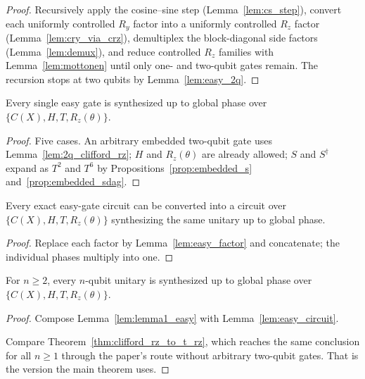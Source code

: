 \begin{proof}
  \leanok
  Recursively apply the cosine--sine step (Lemma~\ref{lem:cs_step}), convert
  each uniformly controlled $R_y$ factor into a uniformly controlled $R_z$
  factor (Lemma~\ref{lem:cry_via_crz}), demultiplex the block-diagonal side
  factors (Lemma~\ref{lem:demux}), and reduce controlled $R_z$ families with
  Lemma~\ref{lem:mottonen} until only one- and two-qubit gates remain.  The
  recursion stops at two qubits by Lemma~\ref{lem:easy_2q}.
\end{proof}

\begin{lemma}
  \label{lem:easy_factor}
  \leanok
  Every single easy gate is synthesized up to global phase over
  $\{C(X), H, T, R_z(\theta)\}$.
\end{lemma}

\begin{proof}
  \leanok
  Five cases.  An arbitrary embedded two-qubit gate uses
  Lemma~\ref{lem:2q_clifford_rz}; $H$ and $R_z(\theta)$ are already allowed;
  $S$ and $S^\dagger$ expand as $T^2$ and $T^6$ by
  Propositions~\ref{prop:embedded_s} and~\ref{prop:embedded_sdag}.
\end{proof}

\begin{lemma}
  \label{lem:easy_circuit}
  \leanok
  Every exact easy-gate circuit can be converted into a circuit over
  $\{C(X),H,T,R_z(\theta)\}$ synthesizing the same unitary up to global phase.
\end{lemma}

\begin{proof}
  \leanok
  Replace each factor by Lemma~\ref{lem:easy_factor} and concatenate; the
  individual phases multiply into one.
\end{proof}

\begin{theorem}
  \label{thm:clifford_rz_from_lemma1}
  \leanok
  For $n \ge 2$, every $n$-qubit unitary is synthesized up to global phase over
  $\{C(X),H,T,R_z(\theta)\}$.
\end{theorem}

\begin{proof}
  \leanok
  Compose Lemma~\ref{lem:lemma1_easy} with Lemma~\ref{lem:easy_circuit}.

  Compare Theorem~\ref{thm:clifford_rz_to_t_rz}, which reaches the same
  conclusion for all $n \ge 1$ through the paper's route without arbitrary
  two-qubit gates.  That is the version the main theorem uses.
\end{proof}
